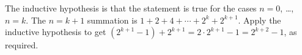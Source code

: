 \documentclass{ibl}  %
\begin{document}
\begin{problem}
\begin{exes}
\begin{answer}
The inductive hypothesis is that 
the statement is true for the cases $n=0$, \ldots, $n=k$.
The $n=k+1$ summation is
$1+2+4+\cdots+2^k+2^{k+1}$. 
Apply the inductive hypothesis to get
$(2^{k+1}-1)+2^{k+1}=2\cdot 2^{k+1}-1=2^{k+2}-1$, as required. 
\end{answer}
\end{exes}




\end{problem}
\end{document}
